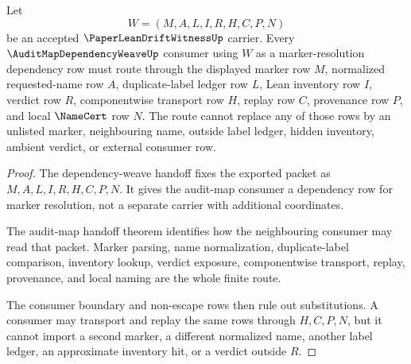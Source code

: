 \begin{theorem}
\label{thm:paper-lean-drift-witness-dependency-routing-scope}
Let
$$
W=(M,A,L,I,R,H,C,P,N)
$$
be an accepted $\PaperLeanDriftWitnessUp$ carrier. Every $\AuditMapDependencyWeaveUp$ consumer using $W$ as a marker-resolution dependency row must route through the displayed marker row $M$, normalized requested-name row $A$, duplicate-label ledger row $L$, Lean inventory row $I$, verdict row $R$, componentwise transport row $H$, replay row $C$, provenance row $P$, and local $\NameCert$ row $N$. The route cannot replace any of those rows by an unlisted marker, neighbouring name, outside label ledger, hidden inventory, ambient verdict, or external consumer row.
\end{theorem}
\begin{proof}
The dependency-weave handoff fixes the exported packet as $M,A,L,I,R,H,C,P,N$. It gives the audit-map consumer a dependency row for marker resolution, not a separate carrier with additional coordinates.

The audit-map handoff theorem identifies how the neighbouring consumer may read that packet. Marker parsing, name normalization, duplicate-label comparison, inventory lookup, verdict exposure, componentwise transport, replay, provenance, and local naming are the whole finite route.

The consumer boundary and non-escape rows then rule out substitutions. A consumer may transport and replay the same rows through $H,C,P,N$, but it cannot import a second marker, a different normalized name, another label ledger, an approximate inventory hit, or a verdict outside $R$.
\end{proof}

